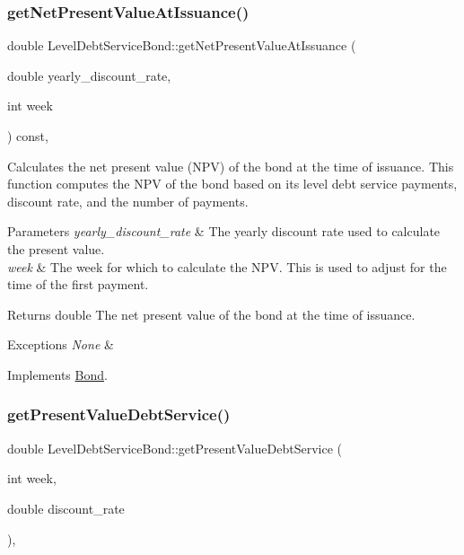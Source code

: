 \subsubsection{\texorpdfstring{get\+Net\+Present\+Value\+At\+Issuance()}{getNetPresentValueAtIssuance()}}
{\footnotesize\ttfamily double Level\+Debt\+Service\+Bond\+::get\+Net\+Present\+Value\+At\+Issuance (\begin{DoxyParamCaption}\item[{double}]{yearly\+\_\+discount\+\_\+rate,  }\item[{int}]{week }\end{DoxyParamCaption}) const\hspace{0.3cm}{\ttfamily [override]}, {\ttfamily [virtual]}}



Calculates the net present value (N\+PV) of the bond at the time of issuance. This function computes the N\+PV of the bond based on its level debt service payments, discount rate, and the number of payments. 


\begin{DoxyParams}{Parameters}
{\em yearly\+\_\+discount\+\_\+rate} & The yearly discount rate used to calculate the present value. \\
\hline
{\em week} & The week for which to calculate the N\+PV. This is used to adjust for the time of the first payment.\\
\hline
\end{DoxyParams}
\begin{DoxyReturn}{Returns}
double The net present value of the bond at the time of issuance.
\end{DoxyReturn}

\begin{DoxyExceptions}{Exceptions}
{\em None} & \\
\hline
\end{DoxyExceptions}


Implements \mbox{\hyperlink{classBond_a5997278813deb16aa5d01bbca8ecc7b2}{Bond}}.

\mbox{\label{classLevelDebtServiceBond_a37801ecfc13ae1b6e05b4330398a7582}} 
\subsubsection{\texorpdfstring{get\+Present\+Value\+Debt\+Service()}{getPresentValueDebtService()}}
{\footnotesize\ttfamily double Level\+Debt\+Service\+Bond\+::get\+Present\+Value\+Debt\+Service (\begin{DoxyParamCaption}\item[{int}]{week,  }\item[{double}]{discount\+\_\+rate }\end{DoxyParamCaption})\hspace{0.3cm}{\ttfamily [override]}, {\ttfamily [virtual]}}



